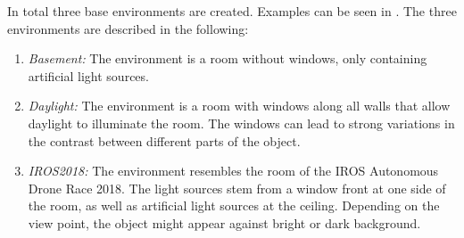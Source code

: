 In total three base environments are created. Examples can be seen in . The three environments are described in the following:
\begin{enumerate}
	\item \textit{Basement:} The environment is a room without windows, only containing artificial light sources. 
	\item \textit{Daylight:} The environment is a room with windows along all walls that allow daylight to illuminate the room. The windows can lead to strong variations in the contrast between different parts of the object.
	\item \textit{IROS2018:} The environment resembles the room of the \ac{IROS} Autonomous Drone Race 2018. The light sources stem from a window front at one side of the room, as well as artificial light sources at the ceiling. Depending on the view point, the object might appear against bright or dark background.
\end{enumerate}

